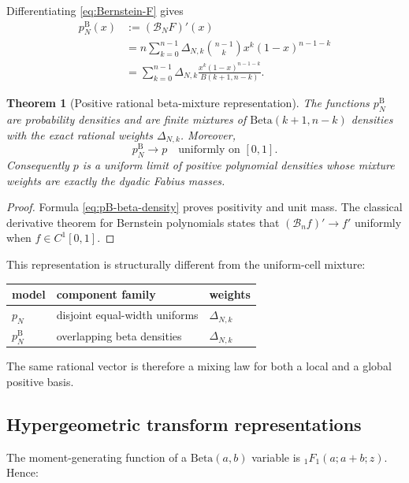 \documentclass[11pt,oneside]{article}
\newtheorem{theorem}{Theorem}[section]
\theoremstyle{definition}
\theoremstyle{remark}
\begin{document}
Differentiating \eqref{eq:Bernstein-F} gives
\begin{align}
 p_N^{\mathrm{B}}(x)
 &:=(\mathcal B_NF)'(x)\\
 &=n\sum_{k=0}^{n-1}\Delta_{N,k}
   \binom{n-1}{k}x^k(1-x)^{n-1-k}\\
 &=\sum_{k=0}^{n-1}\Delta_{N,k}
   \frac{x^k(1-x)^{n-1-k}}{B(k+1,n-k)}.
 \label{eq:pB-beta-density}
\end{align}

\begin{theorem}[Positive rational beta-mixture representation]
\label{thm:beta-mixture}
The functions $p_N^{\mathrm B}$ are probability densities and are finite
mixtures of $\mathrm{Beta}(k+1,n-k)$ densities with the exact rational weights
$\Delta_{N,k}$.  Moreover,
\begin{equation}\label{eq:pB-uniform}
 p_N^{\mathrm B}\longrightarrow p
 \quad\text{uniformly on }[0,1].
\end{equation}
Consequently $p$ is a uniform limit of positive polynomial densities whose
mixture weights are exactly the dyadic Fabius masses.
\end{theorem}

\begin{proof}
Formula \eqref{eq:pB-beta-density} proves positivity and unit mass.  The
classical derivative theorem for Bernstein polynomials states that
$(\mathcal B_n f)'\to f'$ uniformly when $f\in C^1[0,1]$.
\end{proof}

This representation is structurally different from the uniform-cell mixture:
\begin{center}
\begin{tabular}{@{}lll@{}}
\toprule
model & component family & weights\\
\midrule
$p_N$ & disjoint equal-width uniforms & $\Delta_{N,k}$\\
$p_N^{\mathrm B}$ & overlapping beta densities & $\Delta_{N,k}$\\
\bottomrule
\end{tabular}
\end{center}
The same rational vector is therefore a mixing law for both a local and a
global positive basis.

\subsection{Hypergeometric transform representations}

The moment-generating function of a $\mathrm{Beta}(a,b)$ variable is
${}_1F_1(a;a+b;z)$.  Hence:
\end{document}
